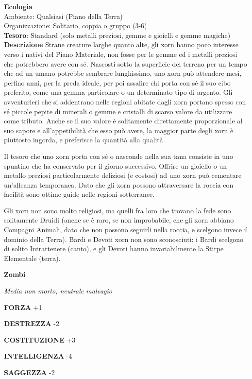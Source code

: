 \begin{multicols}{2}
\textbf{Ecologia}\\
Ambiente: Qualsiasi (Piano della Terra)\\
Organizzazione: Solitario, coppia o gruppo (3-6)\\
\textbf{Tesoro}: Standard (solo metalli preziosi, gemme e gioielli e gemme magiche)\\
\textbf{Descrizione}
Strane creature larghe quanto alte, gli xorn hanno poco interesse verso i nativi del Piano Materiale, non fosse per le gemme ed i metalli preziosi che potrebbero avere con sé. Nascosti sotto la superficie del terreno per un tempo che ad un umano potrebbe sembrare lunghissimo, uno xorn può attendere mesi, perfino anni, per la preda ideale, per poi assalire chi porta con sé il suo cibo preferito, come una gemma particolare o un determinato tipo di argento. Gli avventurieri che si addentrano nelle regioni abitate dagli xorn portano spesso con sé piccole pepite di minerali o gemme e cristalli di scarso valore da utilizzare come tributo. Anche se il suo valore è solitamente direttamente proporzionale al suo sapore e all'appetibilità che esso può avere, la maggior parte degli xorn è piuttosto ingorda, e preferisce la quantità alla qualità.

Il tesoro che uno xorn porta con sé o nasconde nella sua tana consiste in uno spuntino che ha conservato per il giorno successivo. Offrire un gioiello o un metallo preziosi particolarmente deliziosi (e costosi) ad uno xorn può cementare un'alleanza temporanea. Dato che gli xorn possono attraversare la roccia con facilità sono ottime guide nelle regioni sotterranee.

Gli xorn non sono molto religiosi, ma quelli fra loro che trovano la fede sono solitamente Druidi (anche se è raro, se non improbabile, che gli xorn abbiano Compagni Animali, dato che non possono seguirli nella roccia, e scelgono invece il dominio della Terra). Bardi e Devoti xorn non sono sconosciuti: i Bardi scelgono di solito Intrattenere (canto), e gli Devoti hanno invariabilmente la Stirpe Elementale (terra).


\medskip{}\textbf{Zombi}

\textit{Media non morto, neutrale malvagio}

\textbf{FORZA} +1

\textbf{DESTREZZA} -2

\textbf{COSTITUZIONE} +3

\textbf{INTELLIGENZA} -4

\textbf{SAGGEZZA} -2


\end{multicols}
